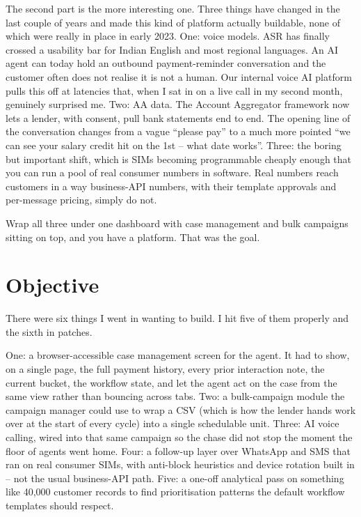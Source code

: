 The second part is the more interesting one. Three things have changed in the last couple of years and made this kind of platform actually buildable, none of which were really in place in early 2023. One: voice models. ASR has finally crossed a usability bar for Indian English and most regional languages. An AI agent can today hold an outbound payment-reminder conversation and the customer often does not realise it is not a human. Our internal voice AI platform pulls this off at latencies that, when I sat in on a live call in my second month, genuinely surprised me. Two: AA data. The Account Aggregator framework now lets a lender, with consent, pull bank statements end to end. The opening line of the conversation changes from a vague ``please pay'' to a much more pointed ``we can see your salary credit hit on the 1st -- what date works''. Three: the boring but important shift, which is SIMs becoming programmable cheaply enough that you can run a pool of real consumer numbers in software. Real numbers reach customers in a way business-API numbers, with their template approvals and per-message pricing, simply do not.

Wrap all three under one dashboard with case management and bulk campaigns sitting on top, and you have a platform. That was the goal.

\section{Objective}
There were six things I went in wanting to build. I hit five of them properly and the sixth in patches.

One: a browser-accessible case management screen for the agent. It had to show, on a single page, the full payment history, every prior interaction note, the current bucket, the workflow state, and let the agent act on the case from the same view rather than bouncing across tabs. Two: a bulk-campaign module the campaign manager could use to wrap a CSV (which is how the lender hands work over at the start of every cycle) into a single schedulable unit. Three: AI voice calling, wired into that same campaign so the chase did not stop the moment the floor of agents went home. Four: a follow-up layer over WhatsApp and SMS that ran on real consumer SIMs, with anti-block heuristics and device rotation built in -- not the usual business-API path. Five: a one-off analytical pass on something like 40,000 customer records to find prioritisation patterns the default workflow templates should respect.

